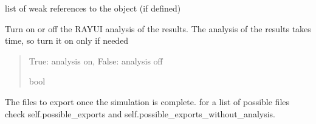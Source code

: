 \documentclass[letterpaper,10pt,english]{sphinxmanual}
\begin{document}
\begin{fulllineitems}
\begin{fulllineitems}
\begin{quote}
\begin{description}
\end{description}\end{quote}

\end{fulllineitems}


\begin{fulllineitems}
\label{\detokenize{index:raypyng.simulate.Simulate.__weakref__}}
\pysigstartsignatures
{}
\pysigstopsignatures
\sphinxAtStartPar
list of weak references to the object (if defined)

\end{fulllineitems}


\begin{fulllineitems}
\label{\detokenize{index:raypyng.simulate.Simulate.analyze}}
\pysigstartsignatures
{}
\pysigstopsignatures
\sphinxAtStartPar
Turn on or off the RAY\sphinxhyphen{}UI analysis of the results.
The analysis of the results takes time, so turn it on only if needed
\begin{quote}\begin{description}
\sphinxAtStartPar
True: analysis on, False: analysis off

\sphinxAtStartPar
bool

\end{description}\end{quote}

\end{fulllineitems}


\begin{fulllineitems}
\label{\detokenize{index:raypyng.simulate.Simulate.exports}}
\pysigstartsignatures
{}
\pysigstopsignatures
\sphinxAtStartPar
The files to export once the simulation is complete.
for a list of possible files check self.possible\_exports
and self.possible\_exports\_without\_analysis.


\end{fulllineitems}
\end{fulllineitems}
\end{document}

